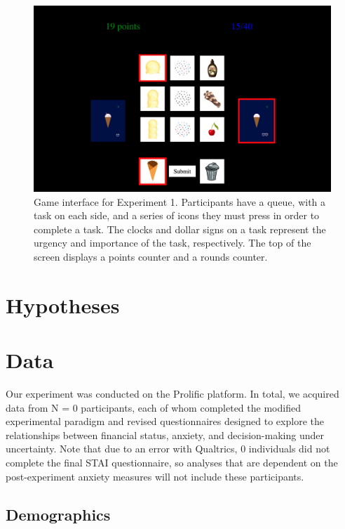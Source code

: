 \documentclass[
]{report}
\begin{document}
\begin{figure}

{\centering \includegraphics{images/exp_example.png}

}

\caption{\label{fig-exp}Game interface for Experiment 1. Participants
have a queue, with a task on each side, and a series of icons they must
press in order to complete a task. The clocks and dollar signs on a task
represent the urgency and importance of the task, respectively. The top
of the screen displays a points counter and a rounds counter.}

\end{figure}

\hypertarget{hypotheses-1}{%
\section{Hypotheses}\label{hypotheses-1}}

\hypertarget{data-1}{%
\section{Data}\label{data-1}}

Our experiment was conducted on the Prolific platform. In total, we
acquired data from N = 0 participants, each of whom completed the
modified experimental paradigm and revised questionnaires designed to
explore the relationships between financial status, anxiety, and
decision-making under uncertainty. Note that due to an error with
Qualtrics, 0 individuals did not complete the final STAI questionnaire,
so analyses that are dependent on the post-experiment anxiety measures
will not include these participants.

\hypertarget{demographics-1}{%
\subsection{Demographics}\label{demographics-1}}
\end{document}
